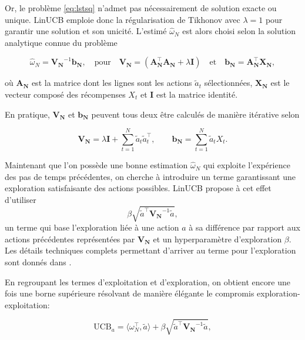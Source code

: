 Or, le problème \eqref{eq:lstsq} n'admet pas nécessairement de solution exacte ou unique.
LinUCB emploie donc la régularisation de Tikhonov \citep{tikhonov1963solution} 
avec $\lambda=1$ pour garantir une solution et son unicité.
L'estimé $\hat{\omega}_N$ est alors choisi selon la solution analytique connue du
problème

\begin{equation}
    \hat{\omega}_N = \mathbf{V_N}^{-1}\mathbf{b_N}, \quad \text{pour} \quad \mathbf{V_N} = (\mathbf{A^\top_N} \mathbf{A_N} + \lambda \mathbf{I}) \quad \text{et} \quad \mathbf{b_N}=\mathbf{A_N^\top} \mathbf{X_N},
    \label{eq:omega_N}
\end{equation}

où $\mathbf{A_N}$ est la matrice dont les lignes sont les actions $\tilde{a}_{t}$ sélectionnées,
$\mathbf{X_N}$ est le vecteur composé des récompenses $X_t$ et $\mathbf{I}$ est la matrice identité.

En pratique, $\mathbf{V_N}$ et $\mathbf{b_N}$ peuvent tous deux être calculés de manière 
itérative selon 

\begin{equation}
\mathbf{V_N} = \lambda \mathbf{I} + \displaystyle \sum_{t=1}^N \tilde{a}_{t} \tilde{a}_{t}^\top, \qquad \mathbf{b_N} = \displaystyle \sum_{t=1}^N \tilde{a}_{t} X_t.
\label{eq:linucb_iteratif}
\end{equation}

Maintenant que l'on possède une bonne estimation $\hat{\omega}_N$ qui exploite l'expérience 
des pas de temps précédentes, on cherche à introduire un terme garantissant une exploration 
satisfaisante des actions possibles.
LinUCB propose à cet effet d'utiliser 
\begin{equation*}
    \beta\sqrt{\tilde{a}^\top \mathbf{V_N}^{-1} \tilde{a}},
    \label{eq:explo_linucb}
\end{equation*}
un terme qui base l'exploration liée à une action $a$ à sa différence par rapport 
aux actions précédentes représentées par $\mathbf{V_N}$ et un hyperparamètre 
d'exploration $\beta$.
Les détails techniques complets permettant d'arriver au terme pour l'exploration sont 
donnés dans \citep{abbasi2011improved}.

En regroupant les termes d'exploitation et d'exploration, on obtient encore une fois 
une borne supérieure résolvant de manière élégante le compromis exploration-exploitation: 

\begin{equation}
    \text{UCB}_a = \langle \omega_N^\top, \tilde{a} \rangle +  \beta\sqrt{\tilde{a}^\top \mathbf{V_N}^{-1} \tilde{a}},
    \label{eq:linucb}
\end{equation}

